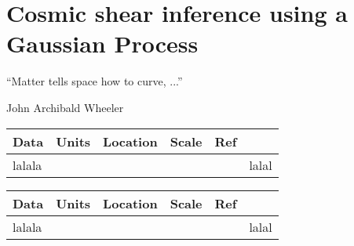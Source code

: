 \documentclass[ucdthesis.tex]{subfiles}
\begin{document}
    
    \doublespacing
		\setcounter{chapter}{3}
		\chapter{Cosmic shear inference using a Gaussian Process}{}{}
		\label{chapter4}
    \epigraph{``Matter tells space how to curve, ...''}{John Archibald Wheeler} 

\begin{table}
\begin{center} 
\begin{tabular}{@{}lccccc}
\hline \hline Data & Units & Location & Scale & Ref \\ \hline
	lalala & & &&& lalal\\
\hline 
\end{tabular} 
\end{center} 
\end{table} 

\begin{table}
\begin{center} 
\begin{tabular}{@{}lccccc}
\hline \hline Data & Units & Location & Scale & Ref \\ \hline
	lalala & & &&& lalal\\
\hline 
\end{tabular} 
\end{center} 
\label{tab:inputs} 
\end{table} 
						 

        
\end{document}
